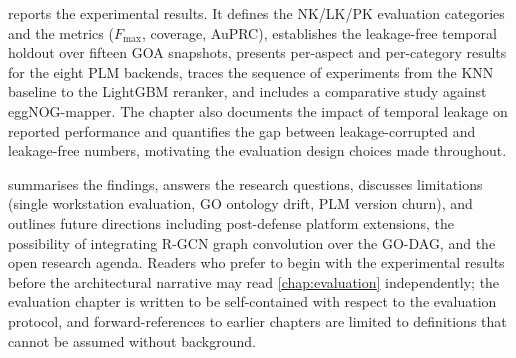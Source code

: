  reports the experimental results. It defines the NK/LK/PK
evaluation categories and the metrics ($F_{\max}$, coverage, AuPRC), establishes the
leakage-free temporal holdout over fifteen GOA snapshots, presents per-aspect and
per-category results for the eight PLM backends, traces the sequence of experiments
from the KNN baseline to the LightGBM reranker, and includes a comparative study
against eggNOG-mapper. The chapter also documents the impact of temporal leakage on
reported performance and quantifies the gap between leakage-corrupted and
leakage-free numbers, motivating the evaluation design choices made throughout.

 summarises the findings, answers the research questions,
discusses limitations (single workstation evaluation, GO ontology drift, PLM version
churn), and outlines future directions including post-defense platform extensions, the
possibility of integrating R-GCN graph convolution over the GO-DAG, and the open
research agenda. Readers who prefer to begin with the experimental results before
the architectural narrative may read \cref{chap:evaluation} independently; the
evaluation chapter is written to be self-contained with respect to the evaluation
protocol, and forward-references to earlier chapters are limited to definitions that
cannot be assumed without background.

